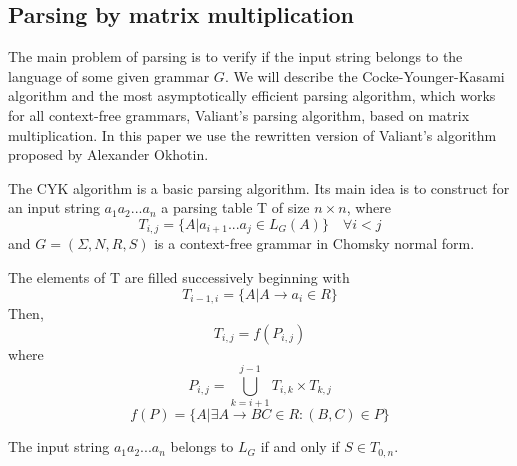 \subsection{Parsing by matrix multiplication}

The main problem of parsing is to verify if the input string belongs to the language of some given grammar $G$. We will describe the Cocke-Younger-Kasami algorithm and the most asymptotically efficient parsing algorithm, which works for all context-free grammars, Valiant's parsing algorithm, based on matrix multiplication. In this paper we use the rewritten version of Valiant's algorithm proposed by Alexander Okhotin.

The CYK algorithm is a basic parsing algorithm. Its main idea is to construct for an input string $a_{1}a_{2}...a_{n}$ a parsing table T of size $n \times n$,  where
\begin{equation}
T_{i, j} =  \{ A |  a_{i + 1}...a_{j} \in L_{G}(A)\} \quad \forall i < j
\end{equation}
and $G = (\Sigma, N, R, S)$ is a context-free grammar in Chomsky normal form.

The elements of T are filled successively beginning with
\begin{equation}
T_{i - 1, i} = \{ A | A \rightarrow a_{i} \in R\}
\end{equation}
Then,
\begin{equation}
T_{i, j} = f(P_{i, j})
\end{equation}
where
\begin{equation}
P_{i, j} = \bigcup\limits_{k = i + 1}^{j - 1} T_{i,k} \times T_{k, j}
\end{equation}
\begin{equation}
f(P) = \{A | \exists A \rightarrow BC \in R : (B, C) \in P\}
\end{equation}

The input string $a_{1}a_{2}...a_{n}$ belongs to $L_{G}$ if and only if $S \in T_{0, n}$.

